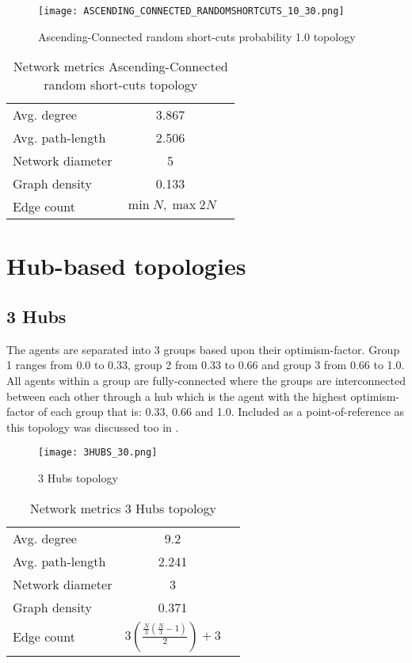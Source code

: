 \documentclass[Bachelorarbeit.tex]{subfiles}
\begin{document}
\begin{figure}[H]
	\centering
  \texttt{[image: ASCENDING\_CONNECTED\_RANDOMSHORTCUTS\_10\_30.png]}
	\caption{Ascending-Connected random short-cuts probability 1.0 topology}
	\label{fig:topology_ASCENDING_CONNECTED_RANDOMSHORTCUTS_10_30}
\end{figure}

\begin{table}[H]
	\centering
	\caption{Network metrics Ascending-Connected random short-cuts topology}
	\begin{tabular} { l c r }
		\hline
		Avg. degree & 3.867 \\
		Avg. path-length & 2.506 \\
		Network diameter & 5 \\
		Graph density & 0.133\\
		Edge count & $\min N, \max 2N$ \\
		\hline
	\end{tabular}
\end{table}

\section{Hub-based topologies}
\subsection{3 Hubs}
The agents are separated into 3 groups based upon their optimism-factor. Group 1 ranges from 0.0 to 0.33, group 2 from 0.33 to 0.66 and group 3 from 0.66 to 1.0. All agents within a group are fully-connected where the groups are interconnected between each other through a hub which is the agent with the highest optimism-factor of each group that is: 0.33, 0.66 and 1.0.
\medskip
Included as a point-of-reference as this topology was discussed too in \cite{Breuer2015}.

\begin{figure}[H]
	\centering
  \texttt{[image: 3HUBS\_30.png]}
	\caption{3 Hubs topology}
	\label{fig:topology_3HUBS_30}
\end{figure}

\begin{table}[H]
	\centering
	\caption{Network metrics 3 Hubs topology}
	\begin{tabular} { l c r }
		\hline
		Avg. degree & 9.2 \\
		Avg. path-length & 2.241 \\
		Network diameter & 3 \\
		Graph density & 0.371\\
		Edge count & $3(\frac{\frac{N}{3}(\frac{N}{3} - 1)}{2}) + 3$ \\
		\hline
	\end{tabular}
\end{table}
\end{document}
